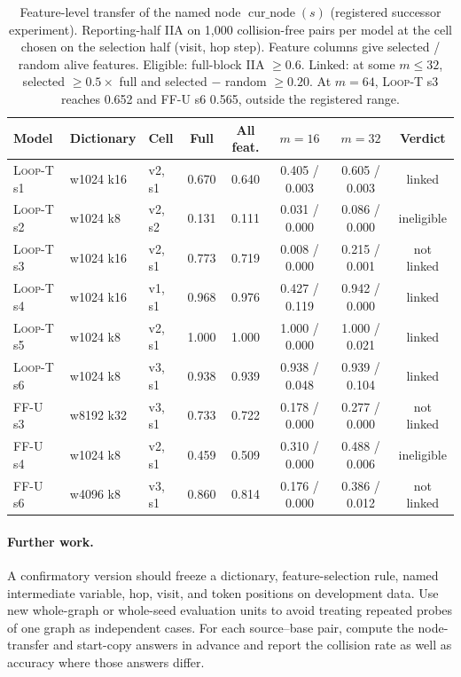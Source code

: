 \documentclass[10pt,letterpaper]{article}
\newcommand{\LoopT}{\textsc{Loop-T}}
\newcommand{\FFU}{\textsc{FF-U}}
\newcommand{\cur}{\operatorname{cur\_node}}
\begin{document}
\begin{table}[t]
\centering
\small
\begin{tabular}{lllccccc}
\toprule
Model & Dictionary & Cell & Full & All feat. & $m{=}16$ & $m{=}32$ & Verdict\\
\midrule
\LoopT{} s1 & w1024 k16 & v2, s1 & 0.670 & 0.640 & 0.405 / 0.003 & 0.605 / 0.003 & linked\\
\LoopT{} s2 & w1024 k8 & v2, s2 & 0.131 & 0.111 & 0.031 / 0.000 & 0.086 / 0.000 & ineligible\\
\LoopT{} s3 & w1024 k16 & v2, s1 & 0.773 & 0.719 & 0.008 / 0.000 & 0.215 / 0.001 & not linked\\
\LoopT{} s4 & w1024 k16 & v1, s1 & 0.968 & 0.976 & 0.427 / 0.119 & 0.942 / 0.000 & linked\\
\LoopT{} s5 & w1024 k8 & v2, s1 & 1.000 & 1.000 & 1.000 / 0.000 & 1.000 / 0.021 & linked\\
\LoopT{} s6 & w1024 k8 & v3, s1 & 0.938 & 0.939 & 0.938 / 0.048 & 0.939 / 0.104 & linked\\
\FFU{} s3 & w8192 k32 & v3, s1 & 0.733 & 0.722 & 0.178 / 0.000 & 0.277 / 0.000 & not linked\\
\FFU{} s4 & w1024 k8 & v2, s1 & 0.459 & 0.509 & 0.310 / 0.000 & 0.488 / 0.006 & ineligible\\
\FFU{} s6 & w4096 k8 & v3, s1 & 0.860 & 0.814 & 0.176 / 0.000 & 0.386 / 0.012 & not linked\\
\bottomrule
\end{tabular}
\caption{Feature-level transfer of the named node $\cur(s)$ (registered successor experiment). Reporting-half IIA on 1,000 collision-free pairs per model at the cell chosen on the selection half (visit, hop step). Feature columns give selected / random alive features. Eligible: full-block IIA $\ge 0.6$. Linked: at some $m\le 32$, selected $\ge 0.5\times$ full and selected $-$ random $\ge 0.20$. At $m=64$, \LoopT{} s3 reaches 0.652 and \FFU{} s6 0.565, outside the registered range.}
\label{tab:featlink}
\end{table}
\paragraph{Further work.} A confirmatory version should freeze a dictionary, feature-selection rule, named intermediate variable, hop, visit, and token positions on development data. Use new whole-graph or whole-seed evaluation units to avoid treating repeated probes of one graph as independent cases. For each source--base pair, compute the node-transfer and start-copy answers in advance and report the collision rate as well as accuracy where those answers differ.
\end{document}
